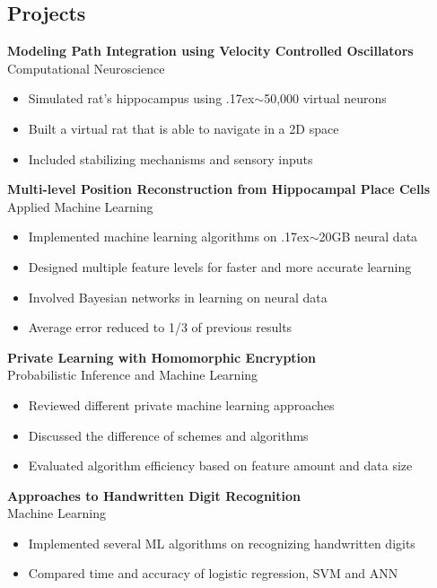 \documentclass[margin]{res}
\begin{document}
\begin{resume}
\section{Projects} 

 {\bf Modeling Path Integration using Velocity Controlled Oscillators}\\
 Computational Neuroscience
 \begin{itemize}  \itemsep -2pt
  \item Simulated rat's hippocampus using {\raise.17ex\hbox{$\scriptstyle\sim$}}50,000 virtual neurons
  \item Built a virtual rat that is able to navigate in a 2D space
  \item Included stabilizing mechanisms and sensory inputs
 \end{itemize}
 
 {\bf Multi-level Position Reconstruction from Hippocampal Place Cells}\\
 Applied Machine Learning
 \begin{itemize}  \itemsep -2pt
  \item Implemented machine learning algorithms on {\raise.17ex\hbox{$\scriptstyle\sim$}}20GB neural data
  \item Designed multiple feature levels for faster and more accurate learning
  \item Involved Bayesian networks in learning on neural data
  \item Average error reduced to 1/3 of previous results
 \end{itemize}
 
 {\bf Private Learning with Homomorphic Encryption}\\
 Probabilistic Inference and Machine Learning
  \begin{itemize}  \itemsep -2pt
  \item Reviewed different private machine learning approaches
  \item Discussed the difference of schemes and algorithms
  \item Evaluated algorithm efficiency based on feature amount and data size
 \end{itemize}
 
  {\bf Approaches to Handwritten Digit Recognition}\\
 Machine Learning
  \begin{itemize}  \itemsep -2pt
  \item Implemented several ML algorithms on recognizing handwritten digits
  \item Compared time and accuracy of logistic regression, SVM and ANN
 \end{itemize}
 

\end{resume}
\end{document}
